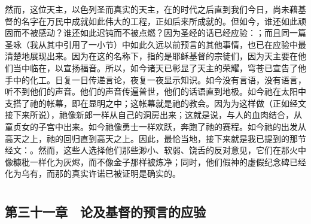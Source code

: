 \par

然而，这位天主，以色列圣而真实的天主，在的时代之后直到我们今日，尚未藉基督的名字在万民中成就如此伟大的工程，正如后来所成就的。但如今，谁还如此顽固而不被感动？谁还如此迟钝而不被点燃？因为圣经的话已经应验：；而且同一篇圣咏（我从其中引用了一小节）中如此久远以前预言的其他事情，也已在应验中最清楚地展现出来。因为在这的名称下，指的是耶稣基督的宗徒们，因为天主要在他们当中临在，以宣扬福音。所以，如今诸天已彰显了天主的荣耀，穹苍已宣告了他手中的化工。日复一日传递言论，夜复一夜显示知识。如今没有言语，没有语言，听不到他们的声音。他们的声音传遍普世，他们的话语直到地极。如今祂在太阳中支搭了祂的帐幕，即在显明之中；这帐幕就是祂的教会。因为为这样做（正如经文接下来所说），祂像新郎一样从自己的洞房出来；这就是说，与人的血肉结合，从童贞女的子宫中出来。如今祂像勇士一样欢跃，奔跑了祂的赛程。如今祂的出发从高天之上，祂的回归直到高天之上。因此，最恰当地，接下来就是我已提到的那节经文：。然而，这些人选择他们那些渺小、软弱、饶舌的反对意见，它们在那火中像糠秕一样化为灰烬，而不像金子那样被炼净；同时，他们假神的虚假纪念碑已经化为乌有，而那的真实许诺已被证明是确实的。\par



\section{}


\subsection{第三十一章　论及基督的预言的应验}

